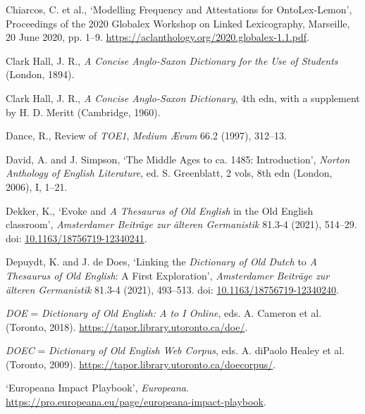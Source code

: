\begin{list}{}
\item %
Chiarcos, C. et al., `Modelling Frequency and Attestations for OntoLex-Lemon', Proceedings of the 2020 Globalex Workshop on Linked Lexicography, Marseille, 20 June 2020, pp. 1–9. \url{https://aclanthology.org/2020.globalex-1.1.pdf}.

\item
Clark Hall, J. R., \textit{A Concise Anglo-Saxon Dictionary for the Use of Students} (London, 1894).

\item
Clark Hall, J. R., \textit{A Concise Anglo-Saxon Dictionary}, 4th edn, with a supplement by H. D. Meritt (Cambridge, 1960).

\item %
Dance, R., Review of \textit{TOE1}, \textit{Medium Ævum} 66.2 (1997), 312–13.

\item %
David, A. and J. Simpson, `The Middle Ages to ca. 1485: Introduction’, \textit{Norton Anthology of English Literature}, ed. S. Greenblatt, 2 vols, 8th edn (London, 2006), I, 1–21.

\item %
Dekker, K., `Evoke and \textit{A Thesaurus of Old English} in the Old English classroom', \textit{Amsterdamer Beiträge zur älteren Germanistik} 81.3-4 (2021), 514–29. doi: \href{https://doi.org/10.1163/18756719-12340241}{\url{10.1163/18756719-12340241}}.

\item %
Depuydt, K. and J. de Does, `Linking the \textit{Dictionary of Old Dutch} to \textit{A Thesaurus of Old English}: A First Exploration', \textit{Amsterdamer Beiträge zur älteren Germanistik} 81.3-4 (2021), 493–513. doi: \href{https://doi.org/10.1163/18756719-12340240}{\url{10.1163/18756719-12340240}}.

\item %
\textit{DOE} = \textit{Dictionary of Old English: A to I Online}, eds. A. Cameron et al. (Toronto, 2018). \url{https://tapor.library.utoronto.ca/doe/}.

\item %
\textit{DOEC} = \textit{Dictionary of Old English Web Corpus}, eds. A. diPaolo Healey et al. (Toronto, 2009). \url{https://tapor.library.utoronto.ca/doecorpus/}.

\item %
`Europeana Impact Playbook', \textit{Europeana}. \url{https://pro.europeana.eu/page/europeana-impact-playbook}.


\end{list}
